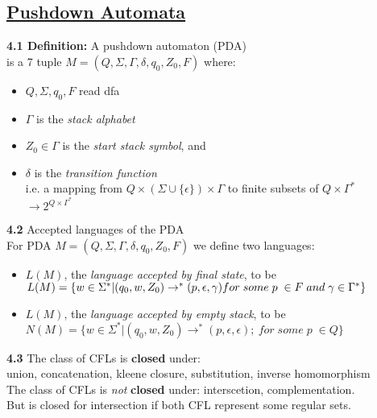 \documentclass{article}
\begin{document}
\begin{multicols}{2}
	\section{\underline{Pushdown Automata}}
	\textbf{4.1 Definition:} A pushdown automaton (PDA) \\
	is a 7 tuple $M =(Q, \Sigma, \Gamma, \delta, q_0, Z_0, F)$ where:
	\begin{itemize}
		\setlength\itemsep{-0.4em}
		\item $Q, \Sigma, q_0, F$ read dfa
		\item $\Gamma$ is the \textit{stack alphabet}
		\item $Z_0 \in \Gamma$ is the \textit{start stack symbol}, and
		\item $\delta$ is the \textit{transition function}\\
		      i.e. a mapping from $Q \times (\Sigma \cup \{\epsilon\}) \times \Gamma$ to finite subsets of $Q \times \Gamma^*$\\
		      $\rightarrow 2^{Q \times \Gamma^*}$
	\end{itemize}
	\textbf{4.2} Accepted languages of the PDA\\
	For PDA $M =(Q, \Sigma, \Gamma, \delta, q_0, Z_0, F)$  we define two languages:
	\begin{itemize}
		\item $L(M)$, the \textit{language accepted by final state}, to be \\
		      \begin{math}
			      L(M) =
			      \{
			      w \in \Sigma^* | (q_0, w, Z_0) \rightarrow^* (p, \epsilon, \gamma)$\\$
			      for\; some\; p\; \in F\; and\; \gamma \in \Gamma^*
			      \}
		      \end{math}
		\item $L(M)$, the \textit{language accepted by empty stack}, to be \\
		      \begin{math}
			      N(M) =
			      \{
			      w \in \Sigma^* | (q_0, w, Z_0) \rightarrow^* (p, \epsilon, \epsilon);\
			      for\; some\; p\; \in Q
			      \}
		      \end{math}
	\end{itemize}

	\textbf{4.3} The class of CFLs is \textbf{closed} under:\\
	union, concatenation, kleene closure, substitution, inverse homomorphism\\
	The class of CFLs is \textit{not} \textbf{closed} under: interscetion, complementation.\\
	But is closed for intersection if both CFL represent some regular sets.


\end{multicols}
\end{document}
